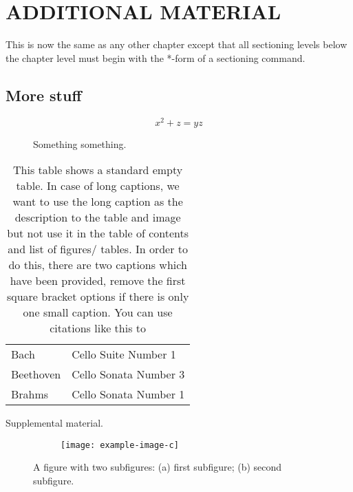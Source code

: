 

\appendixtitle 
\appendix



\chapter{ADDITIONAL MATERIAL} 


This is now the same as any other chapter except that
all sectioning levels below the chapter level must begin
with the *-form of a sectioning command.

\section*{More stuff}
\begin{equation}
    x^2+z=yz
\end{equation}
\begin{figure}
    \caption{Something something.}
\end{figure}
\begin{table}[h!tb] \centering
    \caption[This table shows a standard non-empty table. Please check the code caption for extended instructions]{This table shows a standard empty table. In case of long captions, we want to use the long caption as the description to the table and image but not use it in the table of contents and list of figures/ tables. In order to do this, there are two captions which have been provided, remove the first square bracket options if there is only one small caption. You can use citations like this to}
    \begin{tabular}{ll}
        Bach            &Cello Suite Number 1  \\
        Beethoven       &Cello Sonata Number 3 \\
        Brahms          &Cello Sonata Number 1
      \end{tabular}
\label{nothingagain}

\vspace{ 2 in}
\end{table}
Supplemental material.
\begin{figure}[b]
	\begin{subfigure}[c]{0.495\textwidth}
	\centering\texttt{[image: example-image-c]}%
	\subcaption{\label{fig:2a}}
	\end{subfigure}
	\begin{subfigure}[c]{0.495\textwidth}
	\subcaption{\label{fig:2b}}%
	\end{subfigure}%
	\caption{A figure with two subfigures: (a) first subfigure; (b) second subfigure.\label{fig:2}}
\end{figure}



